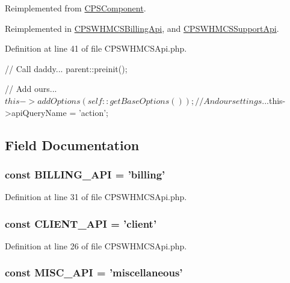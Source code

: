 Reimplemented from \hyperlink{classCPSComponent_a2dc262e99b1c246b56f27626bfe699ff}{CPSComponent}.



Reimplemented in \hyperlink{classCPSWHMCSBillingApi_a2dc262e99b1c246b56f27626bfe699ff}{CPSWHMCSBillingApi}, and \hyperlink{classCPSWHMCSSupportApi_a2dc262e99b1c246b56f27626bfe699ff}{CPSWHMCSSupportApi}.



Definition at line 41 of file CPSWHMCSApi.php.




\begin{DoxyCode}
    {
        //  Call daddy...
        parent::preinit();

        //  Add ours...
        $this->addOptions( self::getBaseOptions() );
    
        //  And our settings...
        $this->apiQueryName = 'action';
    }
\end{DoxyCode}




\subsection{Field Documentation}
\hypertarget{classCPSWHMCSApi_a9580b89431cd08a4216a20b1ef9cbcfa}{
\subsubsection[{BILLING\_\-API}]{\setlength{\rightskip}{0pt plus 5cm}const {\bf BILLING\_\-API} = 'billing'}}
\label{classCPSWHMCSApi_a9580b89431cd08a4216a20b1ef9cbcfa}


Definition at line 31 of file CPSWHMCSApi.php.

\hypertarget{classCPSWHMCSApi_a4cd3e96565485f7e9109773d8ab6de40}{
\subsubsection[{CLIENT\_\-API}]{\setlength{\rightskip}{0pt plus 5cm}const {\bf CLIENT\_\-API} = 'client'}}
\label{classCPSWHMCSApi_a4cd3e96565485f7e9109773d8ab6de40}


Definition at line 26 of file CPSWHMCSApi.php.

\hypertarget{classCPSWHMCSApi_ae5f7cfe2a796124746ddb5ce917c1043}{
\subsubsection[{MISC\_\-API}]{\setlength{\rightskip}{0pt plus 5cm}const {\bf MISC\_\-API} = 'miscellaneous'}}
\label{classCPSWHMCSApi_ae5f7cfe2a796124746ddb5ce917c1043}


